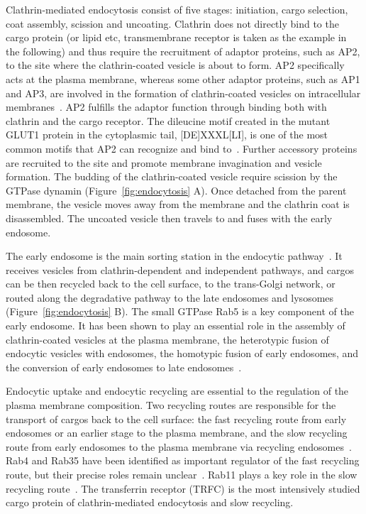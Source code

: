 Clathrin-mediated endocytosis consist of five stages: initiation, cargo selection, coat assembly, scission and uncoating. Clathrin does not directly bind to the cargo protein (or lipid etc, transmembrane receptor is taken as the example in the following) and thus require the recruitment of adaptor proteins, such as AP2, to the site where the clathrin-coated vesicle is about to form. AP2 specifically acts at the plasma membrane, whereas some other adaptor proteins, such as AP1 and AP3, are involved in the formation of clathrin-coated vesicles on intracellular membranes~\cite{McMahon}. AP2 fulfills the adaptor function through binding both with clathrin and the cargo receptor. The dileucine motif created in the mutant GLUT1 protein in the cytoplasmic tail, [DE]XXXL[LI], is one of the most common motifs that AP2 can recognize and bind to~\cite{Humphries}. Further accessory proteins are recruited to the site and promote membrane invagination and vesicle formation. The budding of the clathrin-coated vesicle require scission by the GTPase dynamin (Figure~\ref{fig:endocytosis} A). Once detached from the parent membrane, the vesicle moves away from the membrane and the clathrin coat is disassembled. The uncoated vesicle then travels to and fuses with the early endosome.

The early endosome is the main sorting station in the endocytic pathway~\cite{Huotari}. It receives vesicles from clathrin-dependent and independent pathways, and cargos can be then recycled back to the cell surface, to the trans-Golgi network, or routed along the degradative pathway to the late endosomes and lysosomes (Figure~\ref{fig:endocytosis} B). The small GTPase Rab5 is a key component of the early endosome. It has been shown to play an essential role in the assembly of clathrin-coated vesicles at the plasma membrane, the heterotypic fusion of endocytic vesicles with endosomes, the homotypic fusion of early endosomes, and the conversion of early endosomes to late endosomes~\cite{Stenmark,Huotari}. 

Endocytic uptake and endocytic recycling are essential to the regulation of the plasma membrane composition. Two recycling routes are responsible for the transport of cargos back to the cell surface: the fast recycling route from early endosomes or an earlier stage to the plasma membrane, and the slow recycling route from early endosomes to the plasma membrane via recycling endosomes~\cite{Grant}. Rab4 and Rab35 have been identified as important regulator of the fast recycling route, but their precise roles remain unclear~\cite{Grant}. Rab11 plays a key role in the slow recycling route~\cite{Grant}. The transferrin receptor (TRFC) is the most intensively studied cargo protein of clathrin-mediated endocytosis and slow recycling. 

